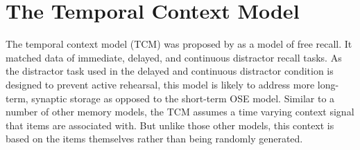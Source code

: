 \chapter{The Temporal Context Model}\label{sec:tcm}
The temporal context model (TCM) was proposed by \textcite{Howard2002} as a model of free recall.
It matched data of immediate, delayed, and continuous distractor recall tasks.
As the distractor task used in the delayed and continuous distractor condition is designed to prevent active rehearsal, this model is likely to address more long-term, synaptic storage as opposed to the short-term OSE model.
Similar to a number of other memory models, the TCM assumes a time varying context signal that items are associated with.
But unlike those other models, this context is based on the items themselves rather than being randomly generated.

